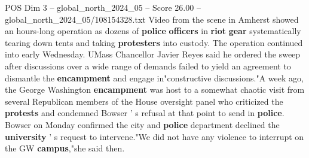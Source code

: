 \begin{textsample}{POS Dim 3 – global\_north\_2024\_05 – Score 26.00 – global\_north\_2024\_05/108154328.txt}
Video from the scene in Amherst showed an hours-long operation as dozens of \textbf{police} \textbf{officers} in \textbf{riot} \textbf{gear} systematically tearing down tents and taking \textbf{protesters} into custody.
The operation continued into early Wednesday.
UMass Chancellor Javier Reyes said he ordered the sweep after discussions over a wide range of demands failed to yield an agreement to dismantle the \textbf{encampment} and engage in"constructive discussions."A week ago, the George Washington \textbf{encampment} was host to a somewhat chaotic visit from several Republican members of the House oversight panel who criticized the \textbf{protests} and condemned Bowser ' s refusal at that point to send in \textbf{police}.
Bowser on Monday confirmed the city and \textbf{police} department declined the \textbf{university} ' s request to intervene."We did not have any violence to interrupt on the GW \textbf{campus},"she said then.

\end{textsample}
